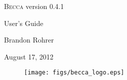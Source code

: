 \documentclass[12pt,oneside]{book}
\begin{document}
\begin{centering}
\thispagestyle{empty}
\vspace{7cm}
{\huge \textsc{Becca} version 0.4.1 
\vspace{1cm}

User's Guide}
\vspace{4cm}

{\Large
Brandon Rohrer
\vspace{1cm}

August 17, 2012}

\vspace{4cm}

\begin{figure}[h]
\centering
\texttt{[image: figs/becca\_logo.eps]}
\end{figure}

\newpage
\end{centering}

\tableofcontents
\newpage

\addtolength{\parskip}{\baselineskip}

\setcounter{tocdepth}{0}











\appendix







%













\end{document}

